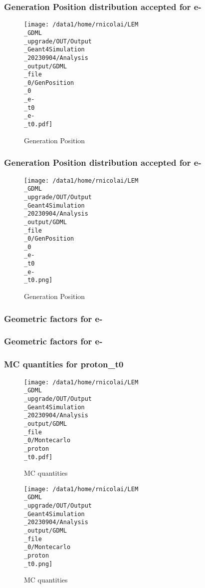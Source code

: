 \documentclass[8pt]{beamer}
\begin{document}
            \begin{frame}
                \frametitle{Generation Position distribution accepted for e-}
            
        \begin{figure}[h]
            \centering
            \texttt{[image: /data1/home/rnicolai/LEM\\\_GDML\\\_upgrade/OUT/Output\\\_Geant4Simulation\\\_20230904/Analysis\\\_output/GDML\\\_file\\\_0/GenPosition\\\_0\\\_e-\\\_t0\\\_e-\\\_t0.pdf]}
            \caption{Generation Position}
        \end{figure}
        
            \end{frame}
            
            \begin{frame}
                \frametitle{Generation Position distribution accepted for e-}
            
        \begin{figure}[h]
            \centering
            \texttt{[image: /data1/home/rnicolai/LEM\\\_GDML\\\_upgrade/OUT/Output\\\_Geant4Simulation\\\_20230904/Analysis\\\_output/GDML\\\_file\\\_0/GenPosition\\\_0\\\_e-\\\_t0\\\_e-\\\_t0.png]}
            \caption{Generation Position}
        \end{figure}
        
            \end{frame}
            
            \begin{frame}
                \frametitle{Geometric factors for e-}
            
            \end{frame}
            
            \begin{frame}
                \frametitle{Geometric factors for e-}
            
            \end{frame}
            
            \begin{frame}
                \frametitle{MC quantities for proton\_t0}
            
        \begin{figure}[h]
            \centering
            \texttt{[image: /data1/home/rnicolai/LEM\\\_GDML\\\_upgrade/OUT/Output\\\_Geant4Simulation\\\_20230904/Analysis\\\_output/GDML\\\_file\\\_0/Montecarlo\\\_proton\\\_t0.pdf]}
            \caption{MC quantities}
        \end{figure}
        
        \begin{figure}[h]
            \centering
            \texttt{[image: /data1/home/rnicolai/LEM\\\_GDML\\\_upgrade/OUT/Output\\\_Geant4Simulation\\\_20230904/Analysis\\\_output/GDML\\\_file\\\_0/Montecarlo\\\_proton\\\_t0.png]}
            \caption{MC quantities}
        \end{figure}
        
            \end{frame}
            
\end{document}

